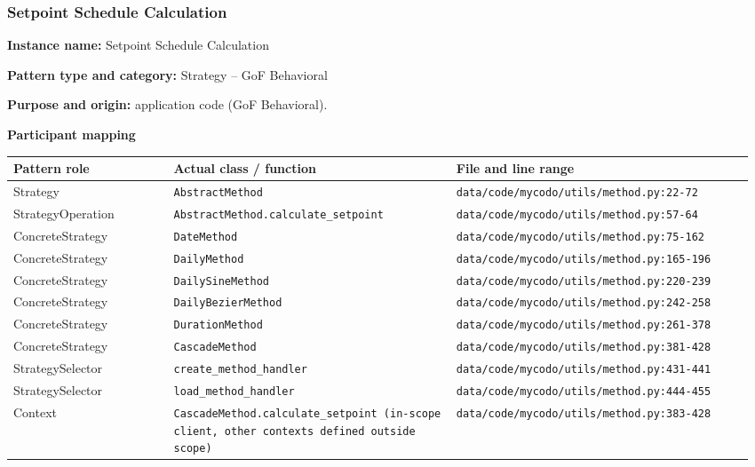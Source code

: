 \documentclass[11pt,a4paper]{article}
\newcommand{\field}[2]{\textbf{#1:} #2\par}
\begin{document}
\subsubsection{Setpoint Schedule Calculation}
\field{Instance name}{Setpoint Schedule Calculation}
\field{Pattern type and category}{Strategy -- GoF Behavioral}
\field{Purpose and origin}{application code (GoF Behavioral).}
\textbf{Participant mapping}\par
{\small\setlength{\tabcolsep}{3pt}
\begin{longtable}{@{}P{0.21\linewidth}P{0.37\linewidth}P{0.39\linewidth}@{}}\toprule
\textbf{Pattern role} & \textbf{Actual class / function} & \textbf{File and line range} \\ \midrule\endhead
Strategy & \texttt{AbstractMethod} & \texttt{data/\allowbreak{}code/\allowbreak{}mycodo/\allowbreak{}utils/\allowbreak{}method.\allowbreak{}py:22-72} \\
StrategyOperation & \texttt{AbstractMethod.\allowbreak{}calculate\_\allowbreak{}setpoint} & \texttt{data/\allowbreak{}code/\allowbreak{}mycodo/\allowbreak{}utils/\allowbreak{}method.\allowbreak{}py:57-64} \\
ConcreteStrategy & \texttt{DateMethod} & \texttt{data/\allowbreak{}code/\allowbreak{}mycodo/\allowbreak{}utils/\allowbreak{}method.\allowbreak{}py:75-162} \\
ConcreteStrategy & \texttt{DailyMethod} & \texttt{data/\allowbreak{}code/\allowbreak{}mycodo/\allowbreak{}utils/\allowbreak{}method.\allowbreak{}py:165-196} \\
ConcreteStrategy & \texttt{DailySineMethod} & \texttt{data/\allowbreak{}code/\allowbreak{}mycodo/\allowbreak{}utils/\allowbreak{}method.\allowbreak{}py:220-239} \\
ConcreteStrategy & \texttt{DailyBezierMethod} & \texttt{data/\allowbreak{}code/\allowbreak{}mycodo/\allowbreak{}utils/\allowbreak{}method.\allowbreak{}py:242-258} \\
ConcreteStrategy & \texttt{DurationMethod} & \texttt{data/\allowbreak{}code/\allowbreak{}mycodo/\allowbreak{}utils/\allowbreak{}method.\allowbreak{}py:261-378} \\
ConcreteStrategy & \texttt{CascadeMethod} & \texttt{data/\allowbreak{}code/\allowbreak{}mycodo/\allowbreak{}utils/\allowbreak{}method.\allowbreak{}py:381-428} \\
StrategySelector & \texttt{create\_\allowbreak{}method\_\allowbreak{}handler} & \texttt{data/\allowbreak{}code/\allowbreak{}mycodo/\allowbreak{}utils/\allowbreak{}method.\allowbreak{}py:431-441} \\
StrategySelector & \texttt{load\_\allowbreak{}method\_\allowbreak{}handler} & \texttt{data/\allowbreak{}code/\allowbreak{}mycodo/\allowbreak{}utils/\allowbreak{}method.\allowbreak{}py:444-455} \\
Context & \texttt{CascadeMethod.\allowbreak{}calculate\_\allowbreak{}setpoint (in-scope client, other contexts defined outside scope)} & \texttt{data/\allowbreak{}code/\allowbreak{}mycodo/\allowbreak{}utils/\allowbreak{}method.\allowbreak{}py:383-428} \\
\bottomrule\end{longtable}}
\end{document}
